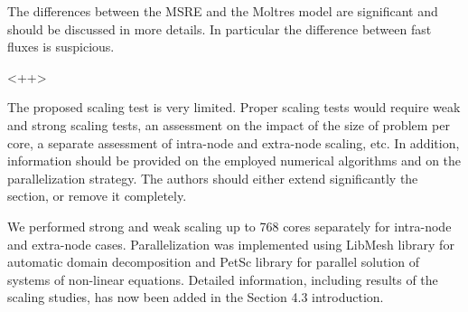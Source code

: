 \documentclass[answers,11pt]{exam}
\begin{document}
\begin{questions}
\question The differences between the MSRE and the Moltres model are significant
and should be discussed in more details. In particular the difference between
fast fluxes is suspicious.
\begin{solution}
        <++>
\end{solution}

\question The proposed scaling test is very limited. Proper scaling tests would
require weak and strong scaling tests, an assessment on the impact of the size
of problem per core, a separate assessment of intra-node and extra-node scaling,
etc. In addition, information should be provided on the employed numerical
algorithms and on the parallelization strategy. The authors should either extend
significantly the section, or remove it completely.
\begin{solution}
        We performed strong and weak scaling up to 768 cores separately for
        intra-node and extra-node cases. Parallelization was implemented using
        LibMesh library for automatic domain decomposition and PetSc
        library for parallel solution of systems of non-linear equations.
        Detailed information, including results of the scaling studies, has now
        been added in the Section 4.3 introduction.
\end{solution}


\end{questions}


  
\end{document}
